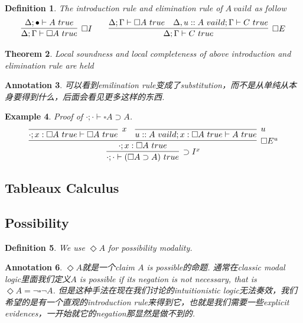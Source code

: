 \documentclass{article}
\theoremstyle{plain}
\newtheorem{theorem}{Theorem}
\newtheorem{example}[theorem]{Example}
\newtheorem{definition}[theorem]{Definition}
\newtheorem{annotation}[theorem]{Annotation}
\theoremstyle{nonumberplain}
\begin{document}
\begin{definition}
\rm The introduction rule and elimination rule of $A~vaild$ as follow
$$
\begin{aligned}
\infer[\square I]{\Delta; \Gamma \vdash \square A~true}{\Delta; \bullet \vdash A~true} &&&& \infer[\square E]{\Delta;\Gamma \vdash C~true}{\Delta;\Gamma \vdash \square A~true & \Delta, u::A~vaild; \Gamma \vdash C~true}
\end{aligned}
$$
\end{definition}

\begin{theorem}
\rm Local soundness and local completeness of above introduction and elimination rule are held 
\end{theorem}

\begin{annotation}
\rm 可以看到emilination rule变成了substitution，而不是从单纯从本身要得到什么，后面会看见更多这样的东西. 
\end{annotation}


\begin{example}
\rm Proof of $\cdot;\cdot\vdash \square A \supset A$.
$$
\infer[\supset I^x]{\cdot;\cdot\vdash (\square A \supset A)~true}{\infer[\square E^u]{\cdot;x:\square A~true}{\infer[x]{\cdot;x:\square A~true \vdash \square A~true}{} & \infer[u]{u::A~vaild; x:\square A~true \vdash A~true}{}  }}
$$
\end{example}

\newpage

\subsection{Tableaux Calculus}


\newpage
\subsection{Possibility}

\begin{definition}
\rm We use $\Diamond A$ for possibility modality.
\end{definition}

\begin{annotation}
\rm $\Diamond A$就是一个claim $A$ is possible的命题. 通常在classic modal logic里面我们定义$A$ is possible if its negation is not necessary, that is $\Diamond A = \neg \square \neg A$. 但是这种手法在现在我们讨论的intuitionistic logic无法奏效，我们希望的是有一个直观的introduction rule来得到它，也就是我们需要一些explicit evidences，一开始就它的negation那显然是做不到的. 
\end{annotation}
\end{document}
